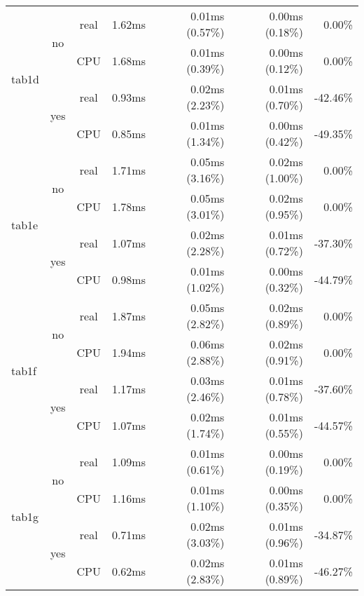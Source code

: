 \documentclass[en]{pracamgr}
\begin{document}
\begin{small}
\begin{longtable}{|l|c|c|r|r|r|r|}
\hline
\multirow{4}{*}{tab1d}    & \multirow{2}{*}{no}  & real & 1.62ms & 0.01ms (0.57\%) & 0.00ms (0.18\%) & 0.00\% \\*
                          &                      & CPU  & 1.68ms & 0.01ms (0.39\%) & 0.00ms (0.12\%) & 0.00\% \\*
                          \cline{2-7}
                          & \multirow{2}{*}{yes} & real & 0.93ms & 0.02ms (2.23\%) & 0.01ms (0.70\%) & -42.46\% \\*
                          &                      & CPU  & 0.85ms & 0.01ms (1.34\%) & 0.00ms (0.42\%) & -49.35\% \\
\hline
\multirow{4}{*}{tab1e}    & \multirow{2}{*}{no}  & real & 1.71ms & 0.05ms (3.16\%) & 0.02ms (1.00\%) & 0.00\% \\*
                          &                      & CPU  & 1.78ms & 0.05ms (3.01\%) & 0.02ms (0.95\%) & 0.00\% \\*
                          \cline{2-7}
                          & \multirow{2}{*}{yes} & real & 1.07ms & 0.02ms (2.28\%) & 0.01ms (0.72\%) & -37.30\% \\*
                          &                      & CPU  & 0.98ms & 0.01ms (1.02\%) & 0.00ms (0.32\%) & -44.79\% \\
\hline
\multirow{4}{*}{tab1f}    & \multirow{2}{*}{no}  & real & 1.87ms & 0.05ms (2.82\%) & 0.02ms (0.89\%) & 0.00\% \\*
                          &                      & CPU  & 1.94ms & 0.06ms (2.88\%) & 0.02ms (0.91\%) & 0.00\% \\*
                          \cline{2-7}
                          & \multirow{2}{*}{yes} & real & 1.17ms & 0.03ms (2.46\%) & 0.01ms (0.78\%) & -37.60\% \\*
                          &                      & CPU  & 1.07ms & 0.02ms (1.74\%) & 0.01ms (0.55\%) & -44.57\% \\
\hline
\multirow{4}{*}{tab1g}    & \multirow{2}{*}{no}  & real & 1.09ms & 0.01ms (0.61\%) & 0.00ms (0.19\%) & 0.00\% \\*
                          &                      & CPU  & 1.16ms & 0.01ms (1.10\%) & 0.00ms (0.35\%) & 0.00\% \\*
                          \cline{2-7}
                          & \multirow{2}{*}{yes} & real & 0.71ms & 0.02ms (3.03\%) & 0.01ms (0.96\%) & -34.87\% \\*
                          &                      & CPU  & 0.62ms & 0.02ms (2.83\%) & 0.01ms (0.89\%) & -46.27\% \\

\end{longtable}
\end{small}
\end{document}
